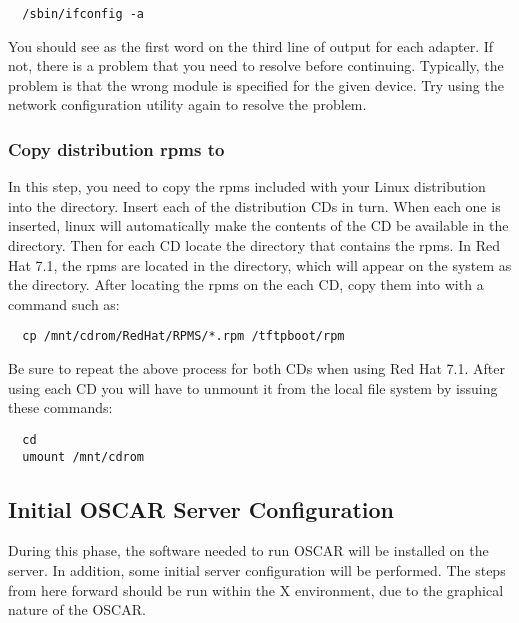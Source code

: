 \begin{verbatim}
  /sbin/ifconfig -a
\end{verbatim}
  
You should see  as the first word on the third line of output
for each adapter. If not, there is a problem that you need to resolve
before continuing. Typically, the problem is that the wrong module is
specified for the given device. Try using the network configuration
utility again to resolve the problem.
  
\subsubsection{Copy distribution rpms to }
\label{det:rpmcopy}

In this step, you need to copy the rpms included with your Linux
distribution into the  directory. 
\begchange
Insert each of the distribution CDs in turn.
When each one is inserted, linux will automatically make the
contents of the CD be available in the  directory.
Then for each CD locate the directory that contains the rpms.
In Red Hat 7.1, the rpms are located in the 
directory, which will appear on the system as the 
 directory. 
\endchange
 After locating the rpms on the each CD, copy them into
 with a command such as:

\begin{verbatim}
  cp /mnt/cdrom/RedHat/RPMS/*.rpm /tftpboot/rpm
\end{verbatim}
  
Be sure to repeat the above process for both CDs when using Red Hat
7.1.
\begchange
After using each CD you will have to unmount it from the local
file system by issuing these commands:

\begin{verbatim}
  cd
  umount /mnt/cdrom
\end{verbatim}
\endchange

  
\subsection{Initial OSCAR Server Configuration}

During this phase, the software needed to run OSCAR will be installed
on the server. In addition, some initial server configuration will be
performed. The steps from here forward should be run within the X
environment, due to the graphical nature of the OSCAR.


